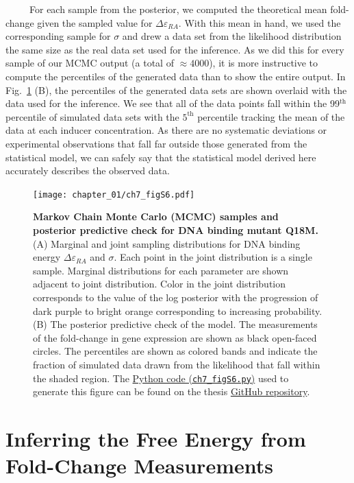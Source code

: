 \documentclass[12pt]{caltech_thesis}
\begin{document}
~~~~~For each sample from the posterior, we computed the theoretical
mean fold-change given the sampled value for \(\Delta\varepsilon_{RA}\).
With this mean in hand, we used the corresponding sample for \(\sigma\)
and drew a data set from the likelihood distribution the same size as
the real data set used for the inference. As we did this for every
sample of our MCMC output (a total of \(\approx 4000\)), it is more
instructive to compute the percentiles of the generated data than to
show the entire output. In Fig.~\ref{fig:epRA_ppc} (B), the percentiles
of the generated data sets are shown overlaid with the data used for the
inference. We see that all of the data points fall within the
99\(^\text{th}\) percentile of simulated data sets with the
\(5^\text{th}\) percentile tracking the mean of the data at each inducer
concentration. As there are no systematic deviations or experimental
observations that fall far outside those generated from the statistical
model, we can safely say that the statistical model derived here
accurately describes the observed data.

\hypertarget{fig:epRA_ppc}{%
\begin{figure}
\centering
\texttt{[image: chapter\_01/ch7\_figS6.pdf]}
\caption[{Markov chain Monte Carlo samples and posterior predictive
check for DNA binding mutant Q18M.}]{\textbf{Markov Chain Monte Carlo
(MCMC) samples and posterior predictive check for DNA binding mutant
Q18M.} (A) Marginal and joint sampling distributions for DNA binding
energy \(\Delta\varepsilon_{RA}\) and \(\sigma\). Each point in the
joint distribution is a single sample. Marginal distributions for each
parameter are shown adjacent to joint distribution. Color in the joint
distribution corresponds to the value of the log posterior with the
progression of dark purple to bright orange corresponding to increasing
probability. (B) The posterior predictive check of the model. The
measurements of the fold-change in gene expression are shown as black
open-faced circles. The percentiles are shown as colored bands and
indicate the fraction of simulated data drawn from the likelihood that
fall within the shaded region. The
\href{https://github.com/gchure/phd/blob/master/src/chapter_07/code/ch7_figS6.py}{Python
code (\texttt{ch7\_figS6.py})} used to generate this figure can be found
on the thesis \href{https://github.com/gchure/phd}{GitHub repository}.}
\label{fig:epRA_ppc}
\end{figure}
}

\hypertarget{inferring-the-free-energy-from-fold-change-measurements}{%
\section{Inferring the Free Energy from Fold-Change
Measurements}\label{inferring-the-free-energy-from-fold-change-measurements}}
\end{document}
